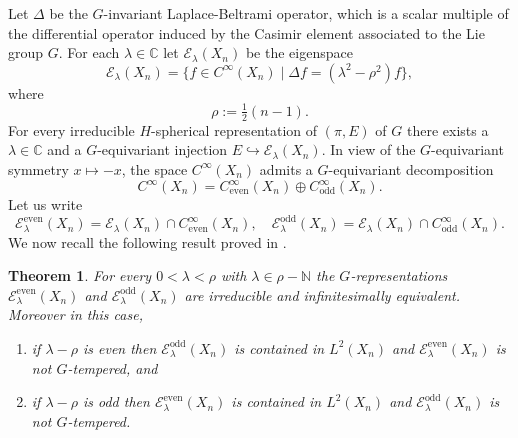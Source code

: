 \documentclass[12pt,letterpaper,titlepage,reqno]{amsart}
\theoremstyle{plain}
\newtheorem{theorem}{Theorem}[section]
\theoremstyle{definition}
\numberwithin{equation}{section}
\newcommand{\C}{\mathbb{C}}
\newcommand{\N}{\mathbb{N}}
\newcommand{\even}{\operatorname{even}}
\newcommand{\odd}{\operatorname{odd}}
\newcommand{\Ec}{\mathcal{E}}
\begin{document}
Let $\Delta$ be the $G$-invariant Laplace-Beltrami operator, which is a scalar multiple of the differential operator induced by the Casimir element associated to the Lie group $G$.
For each $\lambda\in\C$ let $\Ec_\lambda(X_{n})$ be the eigenspace
$$
\Ec_\lambda(X_{n})
=\{f\in C^\infty(X_{n})\mid \Delta f=(\lambda^2-\rho^2)f\},
$$
where
$$
\rho
:=\tfrac12(n-1).
$$
For every irreducible $H$-spherical representation of $(\pi,E)$ of $G$ there exists a $\lambda\in\C$ and a $G$-equivariant injection $E\hookrightarrow \Ec_{\lambda}(X_{n})$.
In view of the $G$-equivariant symmetry $x\mapsto -x$, the space $C^\infty(X_{n})$ admits a $G$-equivariant decomposition
$$
C^\infty(X_{n})
=C_{\even}^\infty(X_{n})\oplus C_{\odd}^\infty(X_{n}).
$$
Let us write
$$
\Ec^{\even}_\lambda(X_{n})
=\Ec_\lambda(X_{n})\cap C_{\even}^\infty(X_{n}),
\quad \Ec^{\odd}_\lambda(X_{n})
=\Ec_\lambda(X_{n})\cap C_{\odd}^\infty(X_{n}).
$$
We now recall the following result proved in \cite[Theorem 1.2]{KKS}.
\begin{theorem} \label{thmkksh1}
For every $0<\lambda<\rho$ with $\lambda\in \rho-\N$ the $G$-representations $\Ec^{\even}_\lambda(X_{n})$ and $\Ec^{\odd}_\lambda(X_{n})$ are irreducible and infinitesimally equivalent. Moreover in this case,
	\begin{enumerate}
		\item
		if $\lambda-\rho$ is even then $\Ec^{\odd}_\lambda(X_{n})$ is contained in $L^2(X_{n})$
		and $\Ec^{\even}_\lambda(X_{n})$ is not $G$-tempered, and
		\item
		if $\lambda-\rho$ is odd then $\Ec^{\even}_\lambda(X_{n})$ is contained in $L^2(X_{n})$
		and $\Ec^{\odd}_\lambda(X_{n})$ is not $G$-tempered.
	\end{enumerate}
\end{theorem}
\end{document}
